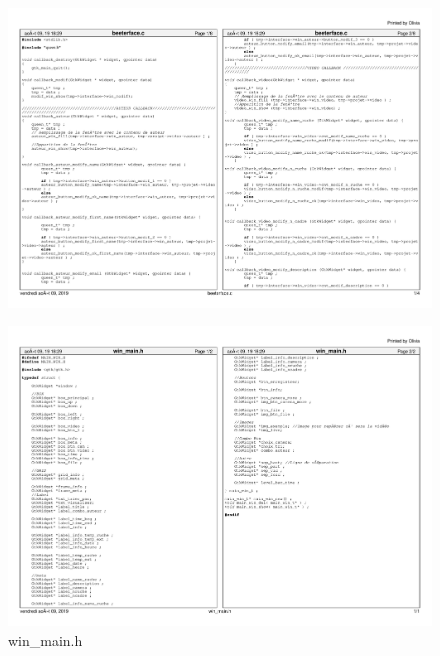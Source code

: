 \documentclass[11pt,french,a4paper]{report}
\begin{document}
\begin{landscape}
\begin{figure}[h]
    \centering
    \includegraphics[page=4,scale=0.9]{../code/beeterface.pdf}
\end{figure}
\end{landscape}


\begin{landscape}
\begin{figure}[h]
    \centering
    \includegraphics[page=1,scale=0.85]{../code/win_main_h.pdf}
    \caption{win\_main.h}
    \label{an4}
\end{figure}
\end{landscape}
\end{document}
